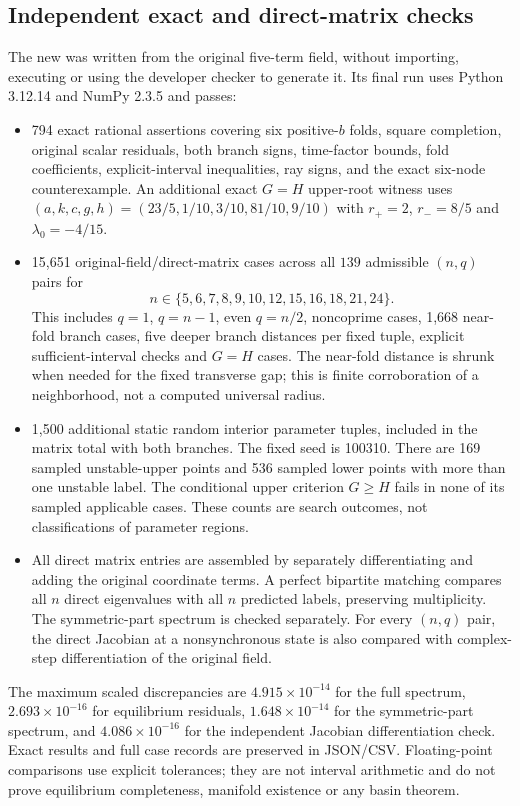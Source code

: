 \documentclass[11pt]{article}
\begin{document}
\subsection{Independent exact and direct-matrix checks}
The new  was written from the original
five-term field, without importing, executing or using the developer checker
to generate it. Its final run uses Python 3.12.14 and NumPy 2.3.5 and passes:
\begin{itemize}[leftmargin=*]
\item 794 exact rational assertions covering six positive-$b$ folds, square
completion, original scalar residuals, both branch signs, time-factor bounds,
fold coefficients, explicit-interval inequalities, ray signs, and the exact
six-node counterexample. An additional exact $G=H$ upper-root witness uses
$(a,k,c,g,h)=(23/5,1/10,3/10,81/10,9/10)$ with
$r_+=2$, $r_-=8/5$ and $\lambda_0=-4/15$.
\item 15,651 original-field/direct-matrix cases across all $139$ admissible
$(n,q)$ pairs for
\[n\in\{5,6,7,8,9,10,12,15,16,18,21,24\}.\]
This includes $q=1$, $q=n-1$,
even $q=n/2$, noncoprime cases, 1,668 near-fold branch cases, five deeper
branch distances per fixed tuple, explicit sufficient-interval checks and
$G=H$ cases. The near-fold distance is shrunk when needed for the fixed
transverse gap; this is finite corroboration of a neighborhood, not a
computed universal radius.
\item 1,500 additional static random interior parameter tuples, included
in the matrix total with both branches. The fixed seed is 100310. There are
169 sampled unstable-upper points and 536 sampled lower points with more
than one unstable label. The conditional upper criterion $G\ge H$ fails
in none of its sampled applicable cases. These counts are search outcomes,
not classifications of parameter regions.
\item All direct matrix entries are assembled by separately differentiating
and adding the original coordinate terms. A perfect bipartite matching
compares all $n$ direct eigenvalues with all $n$ predicted labels, preserving
multiplicity. The symmetric-part spectrum is checked separately. For every
$(n,q)$ pair, the direct Jacobian at a nonsynchronous state is also compared
with complex-step differentiation of the original field.
\end{itemize}
The maximum scaled discrepancies are $4.915\times10^{-14}$ for the full
spectrum, $2.693\times10^{-16}$ for equilibrium residuals,
$1.648\times10^{-14}$ for the symmetric-part spectrum, and
$4.086\times10^{-16}$ for the independent Jacobian differentiation check.
Exact results and full case records are preserved in JSON/CSV. Floating-point
comparisons use explicit tolerances; they are not interval arithmetic and do
not prove equilibrium completeness, manifold existence or any basin theorem.
\end{document}
